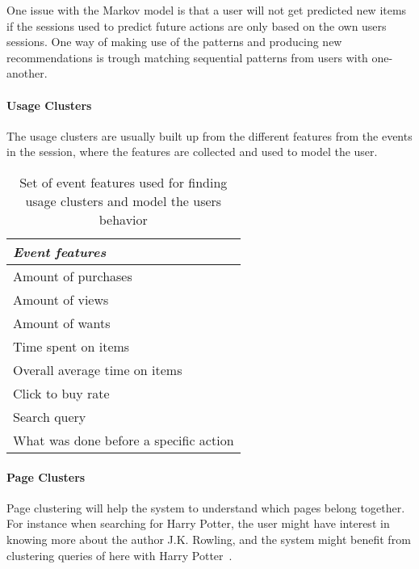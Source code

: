     One issue with the Markov model is that a user will not get predicted new items if the sessions used to predict future actions are only based on the own users sessions.
    One way of making use of the patterns and producing new recommendations is trough matching sequential patterns from users with one-another. 

\paragraph{Usage Clusters} %
    \label{subp:usage_clusters}
    The usage clusters are usually built up from the different features from the events in the session, where the features are collected and used to model the user.

    \begin{table}[H]
        \centering
        \begin{tabular}{l}
        	\toprule
            \emph{Event features} \\ \midrule
            Amount of purchases \\
            Amount of views \\
            Amount of wants  \\
            Time spent on items \\
            Overall average time on items \\
            Click to buy rate \\
            Search query~\cite{Zhang:2006:MSE:1135777.1136004}  \\
            What was done before a specific action  \\
            \bottomrule
        \end{tabular}
        \caption[Event Features]{Set of event features used for finding usage clusters and model the users behavior}
        \label{table:uasageCluster}
    \end{table}

\paragraph{Page Clusters} %
    \label{subp:page_clusters}
    Page clustering will help the system to understand which pages belong together.
    For instance when searching for Harry Potter, the user might have interest in knowing more about the author J.K. Rowling, and the system might benefit from clustering queries of here with Harry Potter~\cite{Zhang:2006:MSE:1135777.1136004}.


